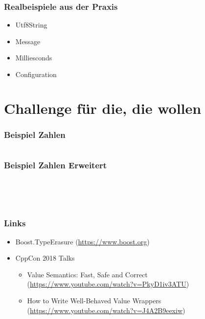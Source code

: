 \begin{frame}[fragile]
	\frametitle{Realbeispiele aus der Praxis}
	\begin{itemize}
		\item Utf8String
		\item Message
		\item Milliesconds
		\item Configuration
	\end{itemize}
\end{frame}

\section{Challenge für die, die wollen}
\begin{frame}[fragile]
	\frametitle{Beispiel Zahlen}
	\inputminted[fontsize=\tiny,firstline=5,lastline=30,framesep=5mm]{cpp}{../code/src/ausblick/01.cpp}
\end{frame}

\begin{frame}[fragile]
	\frametitle{Beispiel Zahlen Erweitert}
	\inputminted[fontsize=\tiny,firstline=55,lastline=63,framesep=5mm]{cpp}{../code/src/ausblick/02.cpp}
	\inputminted[fontsize=\tiny,firstline=65,lastline=65,framesep=5mm]{cpp}{../code/src/ausblick/02.cpp}
	\inputminted[fontsize=\tiny,firstline=67,lastline=67,framesep=5mm]{cpp}{../code/src/ausblick/02.cpp}
	\inputminted[fontsize=\tiny,firstline=69,lastline=69,framesep=5mm]{cpp}{../code/src/ausblick/02.cpp}
	\inputminted[fontsize=\tiny,firstline=71,lastline=72,framesep=5mm]{cpp}{../code/src/ausblick/02.cpp}
\end{frame}

\begin{frame}[fragile]
	\frametitle{Links}
	\begin{itemize}
		\item Boost.TypeErasure (\url{https://www.boost.org})
		\item CppCon 2018 Talks \begin{itemize}
			      \item Value Semantics: Fast, Safe and Correct (\url{https://www.youtube.com/watch?v=PkyD1iv3ATU})
			      \item How to Write Well-Behaved Value Wrappers (\url{https://www.youtube.com/watch?v=J4A2B9eexiw})
		      \end{itemize}
	\end{itemize}
\end{frame}

